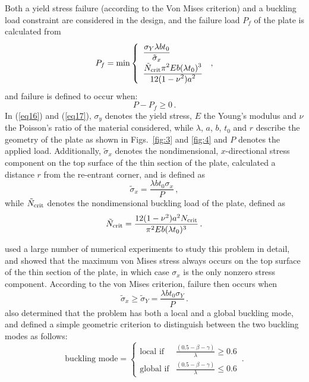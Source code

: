 \documentclass[stropt]{svjour}
\begin{document}
Both a yield stress failure (according to the Von Mises criterion) and a
buckling load constraint are considered in the design, and the failure load
$P_f$ of the plate is calculated from
\begin{equation}
P_f=\min\left\{
\begin{array}{l}
\frac{\strut\displaystyle\sigma_Y\lambda b t_0}{\strut\displaystyle\tilde{\sigma}_x} \\
\frac{\strut\displaystyle\tilde{N}_{{\rm crit}} \pi^2 Eb(\lambda t_0)^3}{\strut\displaystyle12(1-\nu^2)a^2}
\end{array}
\right.\, , \label{eq16}
\end{equation}
and failure is defined to occur when:
\begin{equation}
P-P_f\geq 0\, . \label{eq17}
\end{equation}
In (\ref{eq16}) and (\ref{eq17}), $\sigma_y$ denotes the yield stress, $E$ the
Young's modulus and $\nu$ the Poisson's ratio of the material considered,
while $\lambda$, $a$, $b$, $t_0$ and $r$ describe the geometry of the plate as
shown in Figs.~\ref{fig:3} and \ref{fig:4} and $P$ denotes the applied load.
Additionally, $\tilde{\sigma}_x$ denotes the nondimensional, $x$-directional
stress component on the top surface of the thin section of the plate,
calculated a distance $r$ from the re-entrant corner, and is defined as
\begin{equation}
\tilde{\sigma}_x=\frac{\lambda b t_0\sigma_x}{P}\, ,
\label{eq18}
\end{equation}
while $\tilde{N}_{{\rm crit}}$ denotes the nondimensional buckling load of
the plate, defined as
\begin{equation}
\tilde{N}_{{\rm crit}}=\frac{12(1-\nu^2)a^2 N_{{\rm crit}}}{\pi^2 E b
(\lambda t_0)^3}\, .
\label{eq19}
\end{equation}

\leavevmode\citet{Venter97}
used a large number of numerical experiments to
study this problem in detail, and showed that the maximum von Mises stress
always occurs on the top surface of the thin section of the plate, in which
case $\sigma_x$ is the only nonzero stress component.
According to the von Mises criterion, failure then occurs when
\begin{equation}
\tilde{\sigma}_x\geq \tilde{\sigma}_Y=\frac{\lambda b t_0\sigma_Y}{P}\, .
\label{eq20}
\end{equation}
\cite{Venter97}
also determined that the problem has both a local
and a global buckling mode, and defined a simple geometric criterion to
distinguish between the two buckling modes as follows:
\begin{equation}
\mbox{buckling mode}=\left\{
\begin{array}{ll}
\mbox{local if} & \frac{(0.5-\beta-\gamma)}{\lambda}\geq 0.6 \\[4pt]
\mbox{global if} & \frac{(0.5-\beta-\gamma)}{\lambda}\leq 0.6
\end{array}\, .
\right. \label{eq21}
\end{equation}
\end{document}
